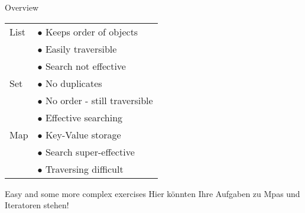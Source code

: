 \begin{frame}{Overview}
	\begin{center}
		\begin{tabular}{ l | l }
			List & $ \bullet $ Keeps order of objects \\
			& $ \bullet $ Easily traversible \\
			& $ \bullet $ Search not effective \\
			\hline
			Set  & $ \bullet $ No duplicates \\
			& $ \bullet $ No order - still traversible \\
			& $ \bullet $ Effective searching \\
			\hline
			Map  & $ \bullet $ Key-Value storage \\
			& $ \bullet $ Search super-effective \\
			& $ \bullet $ Traversing difficult
			
		\end{tabular}
	\end{center}
\end{frame}

\begin{frame}{Easy and some more complex exercises}
	\huge Hier könnten Ihre Aufgaben zu Mpas und Iteratoren stehen!
\end{frame}



